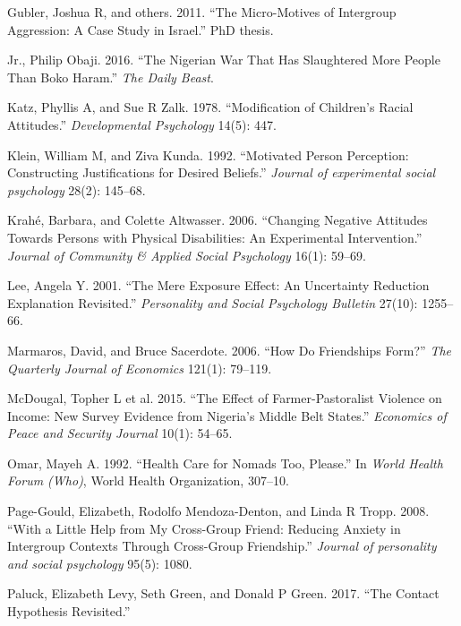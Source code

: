\documentclass[11pt]{article}
\begin{document}
\hypertarget{ref-gubler2011diss}{}
Gubler, Joshua R, and others. 2011. ``The Micro-Motives of Intergroup
Aggression: A Case Study in Israel.'' PhD thesis.

\hypertarget{ref-obaji2016war}{}
Jr., Philip Obaji. 2016. ``The Nigerian War That Has Slaughtered More
People Than Boko Haram.'' \emph{The Daily Beast}.

\hypertarget{ref-katz1978race}{}
Katz, Phyllis A, and Sue R Zalk. 1978. ``Modification of Children's
Racial Attitudes.'' \emph{Developmental Psychology} 14(5): 447.

\hypertarget{ref-klein1992motivated}{}
Klein, William M, and Ziva Kunda. 1992. ``Motivated Person Perception:
Constructing Justifications for Desired Beliefs.'' \emph{Journal of
experimental social psychology} 28(2): 145--68.

\hypertarget{ref-krahe2006disabled}{}
Krahé, Barbara, and Colette Altwasser. 2006. ``Changing Negative
Attitudes Towards Persons with Physical Disabilities: An Experimental
Intervention.'' \emph{Journal of Community \& Applied Social Psychology}
16(1): 59--69.

\hypertarget{ref-lee2001mere}{}
Lee, Angela Y. 2001. ``The Mere Exposure Effect: An Uncertainty
Reduction Explanation Revisited.'' \emph{Personality and Social
Psychology Bulletin} 27(10): 1255--66.

\hypertarget{ref-marmaros2006friendships}{}
Marmaros, David, and Bruce Sacerdote. 2006. ``How Do Friendships Form?''
\emph{The Quarterly Journal of Economics} 121(1): 79--119.

\hypertarget{ref-mcdougal2015effect}{}
McDougal, Topher L et al. 2015. ``The Effect of Farmer-Pastoralist
Violence on Income: New Survey Evidence from Nigeria's Middle Belt
States.'' \emph{Economics of Peace and Security Journal} 10(1): 54--65.

\hypertarget{ref-omar1992health}{}
Omar, Mayeh A. 1992. ``Health Care for Nomads Too, Please.'' In
\emph{World Health Forum (Who)}, World Health Organization, 307--10.

\hypertarget{ref-page2008little}{}
Page-Gould, Elizabeth, Rodolfo Mendoza-Denton, and Linda R Tropp. 2008.
``With a Little Help from My Cross-Group Friend: Reducing Anxiety in
Intergroup Contexts Through Cross-Group Friendship.'' \emph{Journal of
personality and social psychology} 95(5): 1080.

\hypertarget{ref-paluck2017contact}{}
Paluck, Elizabeth Levy, Seth Green, and Donald P Green. 2017. ``The
Contact Hypothesis Revisited.''
\end{document}
